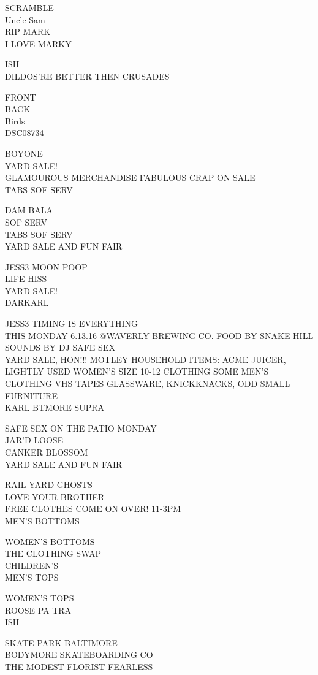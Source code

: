 \documentclass[10pt,letterpaper]{article}
\begin{document}
SCRAMBLE\\
Uncle Sam\\
RIP MARK\\
I LOVE MARKY

ISH\\
DILDOS'RE BETTER THEN CRUSADES

FRONT\\
BACK\\
Birds\\
DSC08734

BOYONE\\
YARD SALE!\\
GLAMOUROUS MERCHANDISE FABULOUS CRAP ON SALE\\
TABS SOF SERV

DAM BALA\\
SOF SERV\\
TABS SOF SERV\\
YARD SALE AND FUN FAIR

JESS3 MOON POOP\\
LIFE HISS\\
YARD SALE!\\
DARKARL

JESS3 TIMING IS EVERYTHING\\
THIS MONDAY 6.13.16 @WAVERLY BREWING CO. FOOD BY SNAKE HILL SOUNDS BY DJ SAFE SEX\\
YARD SALE, HON!!! MOTLEY HOUSEHOLD ITEMS: ACME JUICER, LIGHTLY USED WOMEN'S SIZE 10{-}12 CLOTHING SOME MEN'S CLOTHING VHS TAPES GLASSWARE, KNICKKNACKS, ODD SMALL FURNITURE\\
KARL BTMORE SUPRA

SAFE SEX ON THE PATIO MONDAY\\
JAR'D LOOSE\\
CANKER BLOSSOM\\
YARD SALE AND FUN FAIR

RAIL YARD GHOSTS\\
LOVE YOUR BROTHER\\
FREE CLOTHES COME ON OVER!  11{-}3PM\\
MEN'S BOTTOMS

WOMEN'S BOTTOMS\\
THE CLOTHING SWAP\\
CHILDREN'S\\
MEN'S TOPS

WOMEN'S TOPS\\
ROOSE PA TRA\\
ISH

SKATE PARK BALTIMORE\\
BODYMORE SKATEBOARDING CO\\
THE MODEST FLORIST FEARLESS
\end{document}
